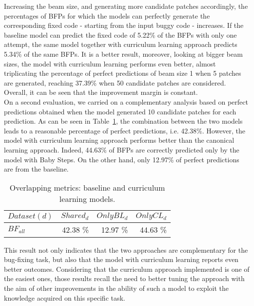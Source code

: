 Increasing the beam size, and generating more candidate patches accordingly,
the percentages of BFPs for which the models can perfectly generate the corresponding
fixed code - starting from the input buggy code - increases. If the baseline model can predict
the fixed code of 5.22\% of the BFPs with only one attempt, the same model together with 
curriculum learning approach predicts 5.34\% of the same BFPs. It is a 
better result, moreover, looking at bigger beam sizes, the model with curriculum learning performs 
even better, almost triplicating the percentage of perfect predictions of beam size 1 when 5 patches are generated,
reaching 37.39\% when 50 candidate patches are considered. Overall, it can be seen that
the improvement margin is constant.\\
On a second evaluation, we carried on a complementary analysis based on perfect predictions
obtained when the model generated 10 candidate patches for each prediction. 
As can be seen 
in Table~\ref{table:pp_bugfixing_overlap}, the combination between the two models 
leads to a reasonable percentage of perfect predictions, i.e. 42.38\%. However, the model 
with curriculum learning approach performs better than the canonical learning approach. Indeed, 44.63\% of BFPs are correctly predicted
only by the model with Baby Steps. On the other hand, only 12.97\% of perfect predictions are from the baseline.
\begin{table}[h!]
    \centering
    \begin{tabular}{l|r|r|r}
    \(Dataset (d)\) & \(Shared_d\) & \(OnlyBL_d\) & \(OnlyCL_d\)\\ [0.5ex]
    \hline 
    \(BF_{all}\) & 42.38 \% & 12.97 \% & 44.63 \%\\  [1ex]
    \end{tabular}
    \caption{Overlapping metrics: baseline and curriculum learning models.}
    \label{table:pp_bugfixing_overlap}
\end{table}
This result not only indicates that the two approaches are complementary for
the bug-fixing task, but also that the model with curriculum learning reports even 
better outcomes. Considering that the curriculum approach implemented is one of the easiest ones,
those results recall the need to better tuning the approach with the aim of 
other improvements in the ability of such a model to exploit the knowledge acquired on 
this specific task. 

